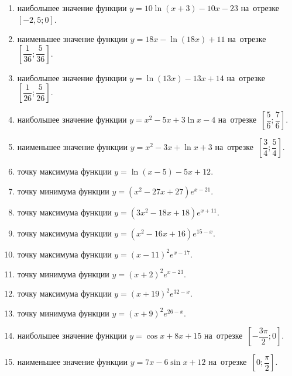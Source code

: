 \documentclass[a4paper,10pt]{article}
\begin{document}
\begin{enumerate}
\item {} наибольшее значение функции $y = 10\ln \left(x+3\right)-10x -23$ на~отрезке~$\left[-2,5;0\right]$.

\item {} наименьшее значение функции $y = 18x-\ln \left(18x\right)+11$ на~отрезке~$\left[\dfrac{1}{36};\dfrac{5}{36}\right]$.

\item {} наибольшее значение функции $y = \ln \left(13x\right)-13x+14$ на~отрезке~$\left[\dfrac{1}{26};\dfrac{5}{26}\right]$.

\item {} наибольшее значение функции $y=x^2-5x+3\ln x-4$ на~отрезке~$\left[\dfrac{5}{6};\dfrac{7}{6}\right]$.

\item {} наименьшее значение функции $y=x^2-3x+\ln x+3$ на~отрезке~$\left[\dfrac{3}{4};\dfrac{5}{4}\right]$.

\item {} точку максимума функции $y=\ln \left(x-5\right)-5x+12$.

\item {} точку минимума функции $y=\left(x^2-27x+27\right)e^{x-21}$.

\item {} точку максимума функции $y=\left(3x^2-18x+18\right)e^{x+11}$.

\item {} точку максимума функции $y=\left(x^2-16x+16\right)e^{15-x}$.

\item {} точку максимума функции $y=\left(x -11\right)^2e^{x-17}$.

\item {} точку минимума функции $y=\left(x +2\right)^2e^{x-23}$.

\item {} точку максимума функции $y=\left(x +19\right)^2e^{32-x}$.

\item {} точку минимума функции $y=\left(x +9\right)^2e^{26-x}$.

\item {} наибольшее значение функции $y=\cos x+8x +15$ на~отрезке~$\left[-\dfrac{3\pi }{2};0\right]$.

\item {} наименьшее значение функции $y=7x-6\sin x +12$ на~отрезке~$\left[0;\dfrac{\pi }{2}\right]$.


\end{enumerate}
\end{document}
